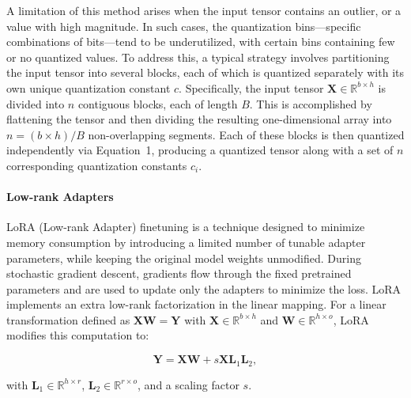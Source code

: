 A limitation of this method arises when the input tensor contains an outlier, or a value with high magnitude. In such cases, the quantization bins—specific combinations of bits—tend to be underutilized, with certain bins containing few or no quantized values. To address this, a typical strategy involves partitioning the input tensor into several blocks, each of which is quantized separately with its own unique quantization constant $c$. Specifically, the input tensor $\mathbf{X}\in \mathbb{R}^{b\times h}$ is divided into $n$ contiguous blocks, each of length $B$. This is accomplished by flattening the tensor and then dividing the resulting one-dimensional array into $n = ({b\times h} )/{B}$ non-overlapping segments. Each of these blocks is then quantized independently via Equation~1, producing a quantized tensor along with a set of $n$ corresponding quantization constants $c_i$.

\paragraph{Low-rank Adapters} LoRA (Low-rank Adapter) finetuning \citep{hu2021lora} is a technique designed to minimize memory consumption by introducing a limited number of tunable adapter parameters, while keeping the original model weights unmodified. During stochastic gradient descent, gradients flow through the fixed pretrained parameters and are used to update only the adapters to minimize the loss. LoRA implements an extra low-rank factorization in the linear mapping. For a linear transformation defined as ${\mathbf{X} \mathbf{W} = \mathbf{Y}}$ with $\mathbf{X}\in  \mathbb{R}^{b\times h}$ and $\mathbf{W}\in  \mathbb{R}^{h\times o}$, LoRA modifies this computation to:

\begin{equation}
    \mathbf{Y} = \mathbf{X}\mathbf{W} + s\mathbf{X}\mathbf{L}_1\mathbf{L}_2,
\end{equation}

with $\mathbf{L}_1\in  \mathbb{R}^{h\times r}$, $\mathbf{L}_2\in  \mathbb{R}^{r\times o}$, and a scaling factor $s$.

